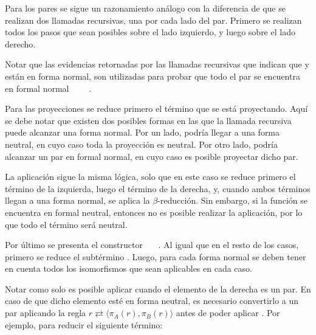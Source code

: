 
Para los pares se sigue un razonamiento análogo con la diferencia de que se realizan dos llamadas recursivas, una por cada lado del par.
Primero se realizan todos los pasos que sean posibles sobre el lado izquierdo, y luego sobre el lado derecho.


Notar que las evidencias retornadas por las llamadas recursivas que indican que  y  están en forma normal, son utilizadas para probar que todo el par se encuentra en formal normal ~~\const{,}~~\const{$\rangle$}.

Para las proyecciones se reduce primero el término que se está proyectando.
Aquí se debe notar que existen dos posibles formas en las que la llamada recursiva puede alcanzar una forma normal.
Por un lado, podría llegar a una forma neutral, en cuyo caso toda la proyección es neutral.
Por otro lado, podría alcanzar un par en formal normal, en cuyo caso es posible proyectar dicho par.


La aplicación sigue la misma lógica, solo que en este caso se reduce primero el término de la izquierda, luego el término de la derecha, y, cuando ambos términos llegan a una forma normal, se aplica la $\beta$-reducción.
Sin embargo, si la función se encuentra en formal neutral, entonces no es posible realizar la aplicación, por lo que todo el término será neutral.


Por último se presenta el constructor \const{[}~~\const{]≡}~.
Al igual que en el resto de los casos, primero se reduce el subtérmino .
Luego, para cada forma normal se deben tener en cuenta todos los isomorfismos que sean aplicables en cada caso.


Notar como solo es posible aplicar  cuando el elemento de la derecha es un par.
En caso de que dicho elemento esté en forma neutral, es necesario convertirlo a un par aplicando la regla $r \rightleftarrows \langle \pi_A (r), \pi_B(r) \rangle$ antes de poder aplicar .
Por ejemplo, para reducir el siguiente término:


